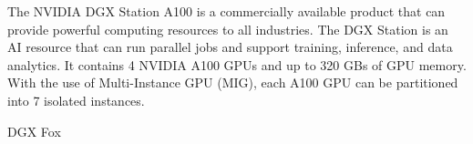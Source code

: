 \documentclass[sigplan,screen]{acmart}
\begin{document}
The NVIDIA DGX Station A100 is a commercially available product that can provide powerful computing resources to all industries. The DGX Station is an AI resource that can run parallel jobs and support training, inference, and data analytics. It contains 4 NVIDIA A100 GPUs and up to 320 GBs of GPU memory. With the use of Multi-Instance GPU (MIG), each A100 GPU can be partitioned into 7 isolated instances.

DGX Fox \cite{www-dgx-station-a100}


%
%
%
\newcommand{\nvidia}[1]{
\ifthenelse{\equal{#1}{A100}}{\href{https://www.nvidia.com/en-us/data-center/a100/}{NVIDIA #1}}{}%
\ifthenelse{\equal{#1}{V100}}{\href{https://www.nvidia.com/en-us/data-center/a100/}{NVIDIA #1}}{}%
\ifthenelse{\equal{#1}{K80}}{\href{https://www.nvidia.com/en-gb/data-center/tesla-k80/}{NVIDIA #1}}{}%
\ifthenelse{\equal{#1}{P100}}{\href{https://www.nvidia.com/en-us/data-center/tesla-p100/}{NVIDIA #1}}{}%
\ifthenelse{\equal{#1}{RTX3090}}{\href{https://www.nvidia.com/en-us/geforce/graphics-cards/30-series/rtx-3090/}{NVIDIA #1}}{}%
\ifthenelse{\equal{#1}{RTX2080TI}}{\href{https://www.nvidia.com/en-eu/geforce/20-series/}{NVIDIA #1}}{}%
\ifthenelse{\equal{#1}{Volta}}{\href{https://www.nvidia.com/en-us/data-center/volta-gpu-architecture/}{NVIDIA #1}}{}%
}
\end{document}
